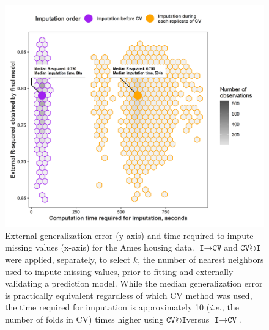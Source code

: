\documentclass[AMA,STIX1COL,doublespace]{WileyNJD-v2}
\begin{document}
\begin{figure}
\includegraphics{figs/fig_ames_cmp_time} 
\caption{External generalization error (y-axis) and time required to impute missing values (x-axis) for the Ames housing data. $\texttt{I}\!\!\rightarrow\!\texttt{CV}$\space and $\texttt{CV}\!\circlearrowright\!\texttt{I}$\space were applied, separately, to select $k$, the number of nearest neighbors used to impute missing values, prior to fitting and externally validating a prediction model. While the median generalization error is practically equivalent regardless of which CV method was used, the time required for imputation is approximately 10 (\textit{i.e., }the number of folds in CV) times higher using $\texttt{CV}\!\circlearrowright\!\texttt{I}$\space versus $\texttt{I}\!\!\rightarrow\!\texttt{CV}$.}
\label{fig:ames_cmp_time}
\end{figure}

\FloatBarrier


\end{document}
